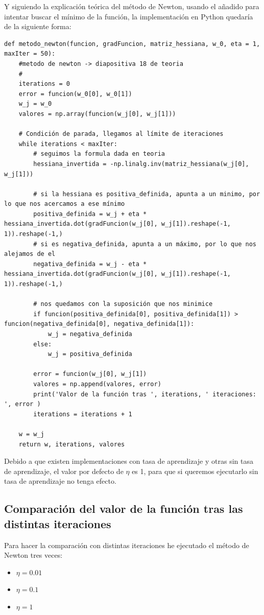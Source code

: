 \documentclass[12pt, spanish]{article}
\begin{document}
Y siguiendo la explicación teórica del método de Newton, usando el añadido para intentar buscar el mínimo de la función, la implementación en Python quedaría de la siguiente forma:
\begin{lstlisting}
def metodo_newton(funcion, gradFuncion, matriz_hessiana, w_0, eta = 1, maxIter = 50):
    #metodo de newton -> diapositiva 18 de teoria
    # 
	iterations = 0
	error = funcion(w_0[0], w_0[1])
	w_j = w_0
	valores = np.array(funcion(w_j[0], w_j[1]))

	# Condición de parada, llegamos al límite de iteraciones
	while iterations < maxIter:
		# seguimos la formula dada en teoria
		hessiana_invertida = -np.linalg.inv(matriz_hessiana(w_j[0], w_j[1]))

		# si la hessiana es positiva_definida, apunta a un minimo, por lo que nos acercamos a ese mínimo
		positiva_definida = w_j + eta * hessiana_invertida.dot(gradFuncion(w_j[0], w_j[1]).reshape(-1, 1)).reshape(-1,)
		# si es negativa_definida, apunta a un máximo, por lo que nos alejamos de el
		negativa_definida = w_j - eta * hessiana_invertida.dot(gradFuncion(w_j[0], w_j[1]).reshape(-1, 1)).reshape(-1,)

		# nos quedamos con la suposición que nos minimice
		if funcion(positiva_definida[0], positiva_definida[1]) > funcion(negativa_definida[0], negativa_definida[1]):
			w_j = negativa_definida
		else:
			w_j = positiva_definida

		error = funcion(w_j[0], w_j[1])
		valores = np.append(valores, error)
		print('Valor de la función tras ', iterations, ' iteraciones: ', error )
		iterations = iterations + 1

	w = w_j
	return w, iterations, valores
\end{lstlisting}

Debido a que existen implementaciones con tasa de aprendizaje y otras sin tasa de aprendizaje, el valor por defecto de $\eta$ es 1, para que si queremos ejecutarlo sin tasa de aprendizaje no tenga efecto.

\subsection{Comparación del valor de la función tras las distintas iteraciones}

Para hacer la comparación con distintas iteraciones he ejecutado el método de Newton tres veces:

\begin{itemize}
	\item $\eta = 0.01$
	\item $\eta = 0.1$
	\item $\eta = 1$
\end{itemize}
\end{document}
